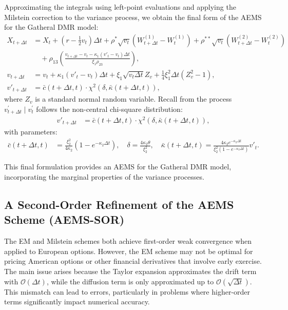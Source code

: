 \documentclass[graybox]{svmult}
\begin{document}
Approximating the integrals using left-point evaluations and applying the Milstein correction to the variance process, we obtain the final form of the AEMS for the Gatheral DMR model:
\begin{align*}
    X_{t+\Delta t} &= X_t + \left(r-\frac{1}{2}v_t\right)\Delta t + \rho^*  \sqrt{v_t}\left(W_{t+\Delta t}^{(1)}-W_t^{(1)}\right) + \rho^{**} \sqrt{v_t}\left(W_{t+\Delta t}^{(2)}-W_t^{(2)}\right)\\
  &\quad + \rho_{13} \left(\frac{v_{t+\Delta t} - v_t - \kappa_1(v'_t - v_t)\Delta t}{\xi_1 \rho_{23}}\right), \\
   v_{t+\Delta t} &= v_t + \kappa_1 (v'_t - v_t) \Delta t + \xi_1 \sqrt{v_t \Delta t} Z_v + \frac{1}{4} \xi_1^2 \Delta t (Z_v^2 - 1), \\
   v'_{t+\Delta t} &= \bar{c}(t+\Delta t,t) \cdot \chi^2(\delta, \bar{\kappa}(t+\Delta t,t)),
\end{align*}
where $Z_v$ is a standard normal random variable. Recall from \cite{broadie2006exact} the process $v_{t+\Delta t}^{\prime} \mid v_t^{\prime}$ follows the non-central chi-square distribution:
\begin{align*}
    v'_{t+\Delta t} &= \bar{c}(t+\Delta t,t) \cdot \chi^2(\delta, \bar{\kappa}(t+\Delta t,t)),
\end{align*}
with parameters:
\begin{align*}
   \bar{c}(t+\Delta t,t) &= \frac{\xi_2^2}{4\kappa_2} \left( 1 - e^{-\kappa_2 \Delta t} \right),\quad  
   \delta = \frac{4\kappa_2\theta}{\xi_2^2},\quad   \bar{\kappa}(t+\Delta t,t) = \frac{4\kappa_2 e^{-\kappa_2 \Delta t}}{\xi_2^2(1 - e^{-\kappa_2 \Delta t})} v'_t.
\end{align*}

This final formulation provides an AEMS for the Gatheral DMR model, incorporating the marginal properties of the variance processes.


\subsection{A Second-Order Refinement of the AEMS Scheme (AEMS-SOR)}

The EM and Milstein schemes both achieve first-order weak convergence when applied to European options. However, the EM scheme may not be optimal for pricing American options or other financial derivatives that involve early exercise. The main issue arises because the Taylor expansion approximates the drift term with $\mathcal{O}(\Delta t)$, while the diffusion term is only approximated up to $\mathcal{O}(\sqrt{\Delta t})$. This mismatch can lead to errors, particularly in problems where higher-order terms significantly impact numerical accuracy.
\end{document}
